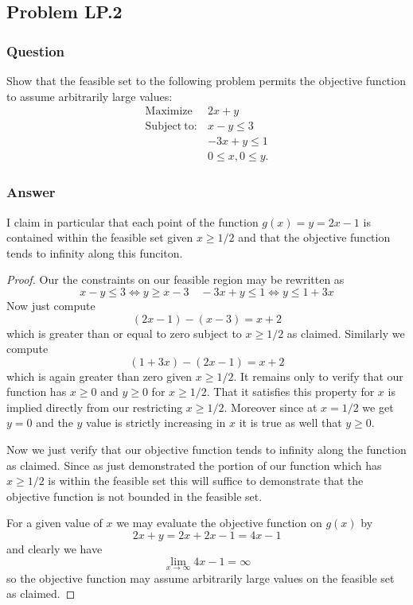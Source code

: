 \documentclass[12pt]{article}
\begin{document}
\subsection{Problem LP.2}
\subsubsection{Question}
Show that the feasible set to the following problem permits the objective function to assume arbitrarily large values:
\[\begin{array}{ll}
\mathrm{Maximize}& 2x+y\\
\mathrm{Subject\ to:}& x-y \leq 3\\
& -3x +y \leq 1\\
& 0 \leq x, 0 \leq y.
\end{array}
\]

\subsubsection{Answer}
I claim in particular that each point of the  function $g(x)=y=2 x -1$ is contained within the feasible set given $x\geq 1/2$ and that the objective function tends to infinity along this funciton. 

\begin{proof}
Our the constraints on our feasible region may be rewritten as
\[ x-y \leq 3  \Leftrightarrow y \geq x - 3  \quad  -3x +y \leq 1 \Leftrightarrow y \leq 1 + 3x \]
Now just compute
\[ (2x -1)-(x-3) = x + 2   \]
which is greater than or equal to zero subject to $x\geq 1/2$ as claimed. Similarly we compute
\[ (1+3x ) - (2x - 1) = x +2\]
which is again greater than zero given $x \geq 1/2.$ It remains only to verify that our function has $x \geq 0$ and $y \geq 0$ for $x \geq 1/2$. That it satisfies this property for $x$ is implied directly from our restricting $x \geq 1/2$. Moreover since at $x = 1/2$ we get $y= 0$ and the $y$ value is strictly increasing in $x$ it is true as well that $y\geq 0$.

Now we just verify that our objective function tends to infinity along the function as claimed. Since as just demonstrated the portion of our function which has $x \geq 1/2$ is within the feasible set this will suffice to demonstrate that the objective function is not bounded in the feasible set.

For a given value of $x$ we may evaluate the objective function on $g(x)$ by 
 \[2x+y = 2x + 2x-1 = 4x -1 \] 
 and clearly we have 
\[\lim_{x \to  \infty} 4x -1 = \infty \]
so the objective function may assume arbitrarily large values on the feasible set as claimed.
\end{proof}
\end{document}
